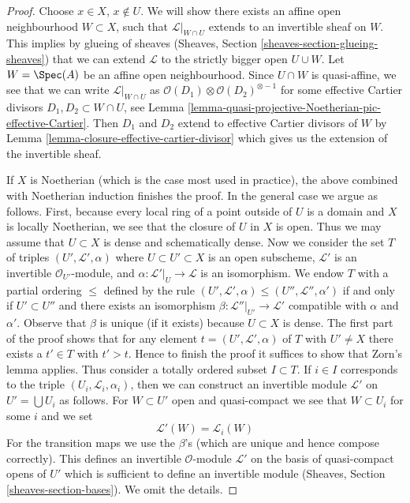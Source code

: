 \begin{proof}
Choose $x \in X$, $x \not \in U$. We will show there exists an
affine open neighbourhood $W \subset X$, such that $\mathcal{L}|_{W \cap U}$
extends to an invertible sheaf on $W$. This implies by glueing of
sheaves (Sheaves, Section \ref{sheaves-section-glueing-sheaves})
that we can extend $\mathcal{L}$ to the strictly bigger open $U \cup W$.
Let $W = \Spec(A)$ be an affine open neighbourhood.
Since $U \cap W$ is quasi-affine, we see that we can write
$\mathcal{L}|_{W \cap U}$ as
$\mathcal{O}(D_1) \otimes \mathcal{O}(D_2)^{\otimes -1}$ for some
effective Cartier divisors $D_1, D_2 \subset W \cap U$, see
Lemma \ref{lemma-quasi-projective-Noetherian-pic-effective-Cartier}.
Then $D_1$ and $D_2$ extend to effective Cartier divisors of
$W$ by Lemma \ref{lemma-closure-effective-cartier-divisor}
which gives us the extension of the invertible sheaf.

\medskip\noindent
If $X$ is Noetherian (which is the case most used in practice), the above
combined with Noetherian induction finishes the proof. In the general case
we argue as follows. First, because every local ring of a point outside
of $U$ is a domain and $X$ is locally Noetherian, we see that the closure
of $U$ in $X$ is open. Thus we may assume that $U \subset X$ is dense
and schematically dense.
Now we consider the set $T$ of triples $(U', \mathcal{L}', \alpha)$
where $U \subset U' \subset X$ is an open subscheme, $\mathcal{L}'$
is an invertible $\mathcal{O}_{U'}$-module, and
$\alpha : \mathcal{L}'|_U \to \mathcal{L}$ is an isomorphism.
We endow $T$ with a partial ordering $\leq$ defined by the rule
$(U', \mathcal{L}', \alpha) \leq (U'', \mathcal{L}'', \alpha')$
if and only if $U' \subset U''$ and there exists an isomorphism
$\beta : \mathcal{L}''|_{U'} \to \mathcal{L}'$ compatible with
$\alpha$ and $\alpha'$. Observe that $\beta$ is unique (if it exists)
because $U \subset X$ is dense. The first part of the proof shows that
for any element $t = (U', \mathcal{L}', \alpha)$ of $T$ with $U' \not = X$
there exists a $t' \in T$ with $t' > t$. Hence to finish the proof it
suffices to show that Zorn's lemma applies. Thus consider a
totally ordered subset $I \subset T$. If $i \in I$ corresponds to
the triple $(U_i, \mathcal{L}_i, \alpha_i)$, then we can construct
an invertible module $\mathcal{L}'$ on $U' = \bigcup U_i$ as follows.
For $W \subset U'$ open and quasi-compact we see that
$W \subset U_i$ for some $i$ and we set
$$
\mathcal{L}'(W) = \mathcal{L}_i(W)
$$
For the transition maps we use the $\beta$'s (which are unique and hence
compose correctly). This defines an invertible $\mathcal{O}$-module
$\mathcal{L}'$ on the basis of quasi-compact opens of $U'$ which is sufficient
to define an invertible module (Sheaves, Section \ref{sheaves-section-bases}).
We omit the details.
\end{proof}

